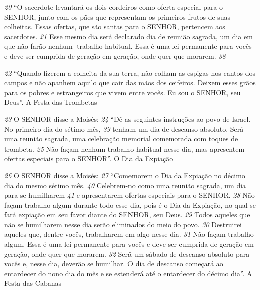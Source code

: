 \textit{\tiny 20}
“O sacerdote levantará os dois cordeiros como oferta especial para o SENHOR,
junto com os pães que representam os primeiros frutos de suas colheitas. Essas
ofertas, que são santas para o SENHOR, pertencem aos sacerdotes. 
\textit{\tiny 21}
Esse mesmo
dia será declarado dia de reunião sagrada, um dia em que não farão nenhum
trabalho habitual. Essa é uma lei permanente para vocês e deve ser cumprida de
geração em geração, onde quer que morarem.
\textit{\tiny 38}

   
\textit{\tiny 22}
“Quando fizerem a colheita da sua terra, não colham as espigas nos cantos
dos campos e não apanhem aquilo que cair das mãos dos ceifeiros. Deixem esses
grãos para os pobres e estrangeiros que vivem entre vocês. Eu sou o SENHOR, seu
Deus”.
A Festa das Trombetas

\textit{\tiny 23}
O SENHOR disse a Moisés: 
\textit{\tiny 24}
“Dê as seguintes instruções ao povo de Israel. No
primeiro dia do sétimo mês,
\textit{\tiny 39}
 tenham um dia de descanso absoluto. Será uma
reunião sagrada, uma celebração memorial comemorada com toques de
trombeta. 
\textit{\tiny 25}
Não façam nenhum trabalho habitual nesse dia, mas apresentem
ofertas especiais para o SENHOR”.
O Dia da Expiação

\textit{\tiny 26}
O SENHOR disse a Moisés: 
\textit{\tiny 27}
“Comemorem o Dia da Expiação no décimo dia do
mesmo sétimo mês.
\textit{\tiny 40}
 Celebrem-no como uma reunião sagrada, um dia para se
humilharem
\textit{\tiny 41}
 e apresentarem ofertas especiais para o SENHOR. 
\textit{\tiny 28}
Não façam
trabalho algum durante todo esse dia, pois é o Dia da Expiação, no qual se fará
expiação em seu favor diante do SENHOR, seu Deus. 
\textit{\tiny 29}
Todos aqueles que não se
humilharem nesse dia serão eliminados do meio do povo. 
\textit{\tiny 30}
Destruirei aqueles
que, dentre vocês, trabalharem em algo nesse dia. 
\textit{\tiny 31}
Não façam trabalho algum.
Essa é uma lei permanente para vocês e deve ser cumprida de geração em
geração, onde quer que morarem. 
\textit{\tiny 32}
Será um sábado de descanso absoluto para
vocês e, nesse dia, deverão se humilhar. O dia de descanso começará ao
entardecer do nono dia do mês e se estenderá até o entardecer do décimo dia”.
A Festa das Cabanas

